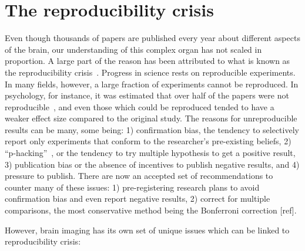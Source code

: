 \clearpage
\section{The reproducibility crisis}

Even though thousands of papers are published every year about different aspects of the brain, our understanding of this complex organ has not scaled in proportion. A large part of the reason has been attributed to what is known as the reproducibility crisis~\citep{ioannidis2005most, simmons2011false, button2013power}. %
Progress in science rests on reproducible experiments. In many fields, however, a large fraction of experiments cannot be reproduced. In psychology, for instance, it was estimated that over half of the papers were not reproducible~\citep{open2015estimating}, and even those which could be reproduced tended to have a weaker effect size compared to the original study. The reasons for unreproducible results can be many, some being: 1) confirmation bias, the tendency to selectively report only experiments that conform to the researcher's pre-existing beliefs, 2) ``p-hacking''~\citep{simmons2011false}, or the tendency to try multiple hypothesis to get a positive result, 3) publication bias or the absence of incentives to publish negative results, and 4) pressure to publish. There are now an accepted set of recommendations to counter many of these issues: 1) pre-registering research plans to avoid confirmation bias and even report negative results, 2) correct for multiple comparisons, the most conservative method being the Bonferroni correction [ref]. 

However, brain imaging has its own set of unique issues which can be linked to reproducibility crisis: 


